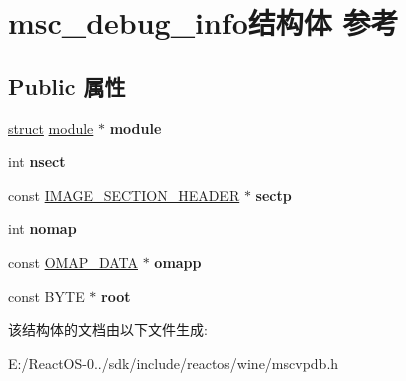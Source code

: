 \hypertarget{structmsc__debug__info}{}\section{msc\+\_\+debug\+\_\+info结构体 参考}
\label{structmsc__debug__info}
\subsection*{Public 属性}
\begin{DoxyCompactItemize}
\item 
\mbox{\label{structmsc__debug__info_a5861356fd9fa01dd5030664ff797d57b}} 
\hyperlink{interfacestruct}{struct} \hyperlink{structmodule}{module} $\ast$ {\bfseries module}
\item 
\mbox{\label{structmsc__debug__info_a4a0430a6c6523580526a3577a6cd0216}} 
int {\bfseries nsect}
\item 
\mbox{\label{structmsc__debug__info_a375509aaec38ede80ba4d26a3ebb0f36}} 
const \hyperlink{struct___i_m_a_g_e___s_e_c_t_i_o_n___h_e_a_d_e_r}{I\+M\+A\+G\+E\+\_\+\+S\+E\+C\+T\+I\+O\+N\+\_\+\+H\+E\+A\+D\+ER} $\ast$ {\bfseries sectp}
\item 
\mbox{\label{structmsc__debug__info_ae69e9077d03605fadcf00eb8868c6195}} 
int {\bfseries nomap}
\item 
\mbox{\label{structmsc__debug__info_ac03e30de92756774c63c46b1a9ab8e17}} 
const \hyperlink{struct_o_m_a_p___d_a_t_a}{O\+M\+A\+P\+\_\+\+D\+A\+TA} $\ast$ {\bfseries omapp}
\item 
\mbox{\label{structmsc__debug__info_a347d87aaef4460c1fbc3ec59f5142a7d}} 
const B\+Y\+TE $\ast$ {\bfseries root}
\end{DoxyCompactItemize}


该结构体的文档由以下文件生成\+:\begin{DoxyCompactItemize}
\item 
E\+:/\+React\+O\+S-\/0../sdk/include/reactos/wine/mscvpdb.\+h\end{DoxyCompactItemize}
